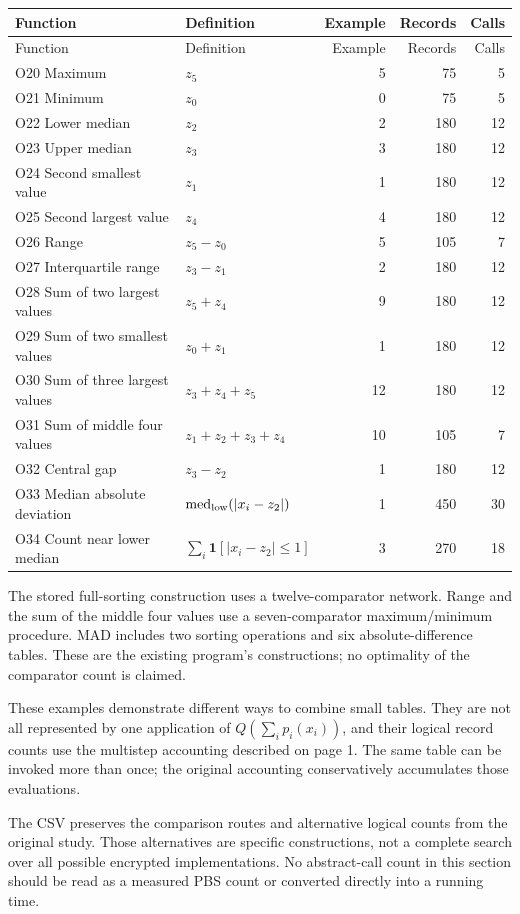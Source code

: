 \documentclass[a4paper,10pt]{article}
\newcommand{\ind}{\mathbf{1}}
\begin{document}
\begin{longtable}{@{}p{60mm}p{58mm}rrr@{}}
\toprule
Function & Definition & Example & Records & Calls\\\midrule
\endfirsthead
\toprule
Function & Definition & Example & Records & Calls\\\midrule
\endhead
O20 Maximum & $z_5$ & 5 & 75 & 5\\
O21 Minimum & $z_0$ & 0 & 75 & 5\\
O22 Lower median & $z_2$ & 2 & 180 & 12\\
O23 Upper median & $z_3$ & 3 & 180 & 12\\
O24 Second smallest value & $z_1$ & 1 & 180 & 12\\
O25 Second largest value & $z_4$ & 4 & 180 & 12\\
O26 Range & $z_5-z_0$ & 5 & 105 & 7\\
O27 Interquartile range & $z_3-z_1$ & 2 & 180 & 12\\
O28 Sum of two largest values & $z_5+z_4$ & 9 & 180 & 12\\
O29 Sum of two smallest values & $z_0+z_1$ & 1 & 180 & 12\\
O30 Sum of three largest values & $z_3+z_4+z_5$ & 12 & 180 & 12\\
O31 Sum of middle four values & $z_1+z_2+z_3+z_4$ & 10 & 105 & 7\\
O32 Central gap & $z_3-z_2$ & 1 & 180 & 12\\
O33 Median absolute deviation & $\operatorname{med}_{\rm low}(|x_i-z_2|)$ & 1 & 450 & 30\\
O34 Count near lower median & $\sum_i\ind[|x_i-z_2|\le1]$ & 3 & 270 & 18\\
\bottomrule\end{longtable}

The stored full-sorting construction uses a twelve-comparator network. Range and the sum of the middle four values use a seven-comparator maximum/minimum procedure. MAD includes two sorting operations and six absolute-difference tables. These are the existing program's constructions; no optimality of the comparator count is claimed.

These examples demonstrate different ways to combine small tables. They are not all represented by one application of $Q(\sum_i p_i(x_i))$, and their logical record counts use the multistep accounting described on page 1. The same table can be invoked more than once; the original accounting conservatively accumulates those evaluations.

The CSV preserves the comparison routes and alternative logical counts from the original study. Those alternatives are specific constructions, not a complete search over all possible encrypted implementations. No abstract-call count in this section should be read as a measured PBS count or converted directly into a running time.
\end{document}
